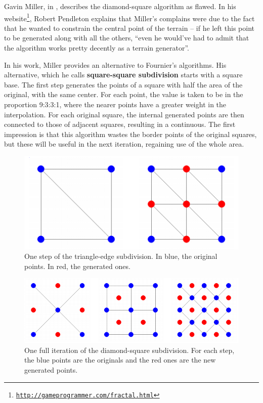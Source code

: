 \documentclass{acmtog}
\begin{document}
Gavin Miller, in \cite{Miller86}, describes the diamond-square algorithm as flawed. In his website\footnote{\texttt{\url{http://gameprogrammer.com/fractal.html}}}, Robert Pendleton explains that Miller's complains were due to the fact that he wanted to constrain the central point of the terrain -- if he left this point to be generated along with all the others, ``even he would've had to admit that the algorithm works pretty decently as a terrain generator''.

In his work, Miller provides an alternative to Fournier's algorithms. His alternative, which he calls \textbf{square-square subdivision} starts with a square base. The first step generates the points of a square with half the area of the original, with the same center. For each point, the value is taken to be in the proportion 9:3:3:1, where the nearer points have a greater weight in the interpolation. For each original square, the internal generated points are then connected to those of adjacent squares, resulting in a continuous. The first impression is that this algorithm wastes the border points of the original squares, but these will be useful in the next iteration, regaining use of the whole area.

\begin{figure}
	\begin{center}
		\includegraphics[width=\columnwidth]{images/algorithm/triangleedge.png}
	\end{center}
	\caption{One step of the triangle-edge subdivision. In blue, the original points. In red, the generated ones.}
	\label{fig:algorithm:tes}
\end{figure}

\begin{figure}
	\begin{center}
		\includegraphics[width=\columnwidth]{images/algorithm/diamondsquare.png}
	\end{center}
	\caption{One full iteration of the diamond-square subdivision. For each step, the blue points are the originals and the red ones are the new generated points.}
	\label{fig:algorithm:dss}
\end{figure}
\end{document}
